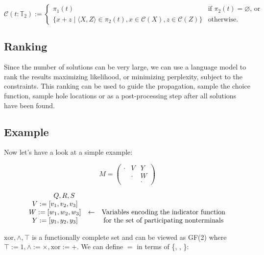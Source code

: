 \documentclass[runningheads]{llncs}
\begin{document}
\begin{equation*}
  \mathcal{C}(t: \mathbb{T}_2) := \begin{cases}
                     \pi_1(t) & \text{if $\pi_2(t) = \varnothing$, or}\\
                     \big\{x + z \mid \langle X, Z\rangle \in \pi_2(t), x \in \mathcal{C}(X), z \in \mathcal{C}(Z)\big\} & \text{otherwise.}%
  \end{cases}
\end{equation*}

\subsection{Ranking}

Since the number of solutions can be very large, we can use a language model to rank the results maximizing likelihood, or minimizing perplexity, subject to the constraints. This ranking can be used to guide the propagation, sample the choice function, sample hole locations or as a post-processing step after all solutions have been found.

\subsection{Example}

Now let's have a look at a simple example:

\[
  M = \begin{pmatrix}
        \cdot & V & Y \\
        & \cdot & W \\
        & & \cdot
  \end{pmatrix}
\]

\[
  \begin{array}{c c c}
    \phantom{V := [}Q, R, S \\

    V := [v_1, v_2, v_3] \\
    W := [w_1, w_2, w_3] & \leftarrow & \text{Variables encoding the indicator function} \\
    Y := [y_1, y_2, y_3] & & \text{for the set of participating nonterminals}
  \end{array}
\]

$\text{xor}, \land, \top$ is a functionally complete set and can be viewed as GF(2) where $\top := 1, \land := \times, \text{xor} := +$. We can define $=$ in terms of \{, \land, \top \}:
\end{document}
